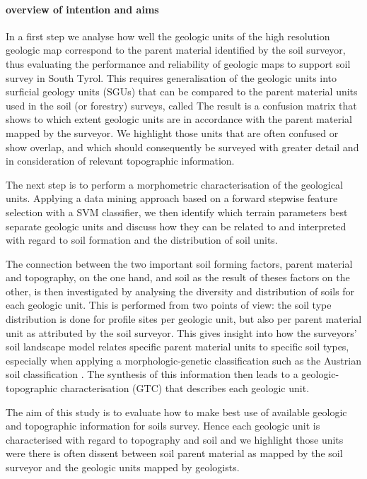 \documentclass[preprint,12pt,authoryear]{elsarticle}
\begin{document}
\paragraph{overview of intention and aims}
In a first step we analyse how well the geologic units of the high resolution geologic map correspond to the parent material identified by the soil surveyor, thus evaluating the performance and reliability of geologic maps to support soil survey in South Tyrol. This requires generalisation of the geologic units into surficial geology units (SGUs) that can be compared to the parent material units used in the soil (or forestry) surveys, called  The result is a confusion matrix that shows to which extent geologic units are in accordance with the parent material mapped by the surveyor.  We highlight those units that are often confused or show overlap, and which should consequently be surveyed with greater detail and in consideration of relevant topographic information.

The next step is to perform a morphometric characterisation of the geological units. Applying a data mining approach based on a forward stepwise feature selection with a SVM classifier, we then identify which terrain parameters best separate geologic units and discuss how they can be related to and interpreted with regard to soil formation and the distribution of soil units.

The connection between the two important soil forming factors, parent material and topography, on the one hand, and soil as the result of theses factors on the other, is then investigated by analysing the diversity and distribution of soils for each geologic unit. This is performed from two points of view: the soil type distribution is done for profile sites per geologic unit, but also per parent material unit as attributed by the soil surveyor. This gives insight into how the surveyors' soil landscape model relates specific parent material units to specific soil types, especially when applying a morphologic-genetic classification such as the Austrian soil classification \citep{Nestroy2011}. The synthesis of this information then leads to a geologic-topographic characterisation (GTC) that describes each geologic unit. 

The aim of this study is to evaluate how to make best use of available geologic and topographic information for soils survey. Hence each geologic unit is characterised with regard to topography and soil and we highlight those units were there is often dissent between soil parent material as mapped by the soil surveyor and the geologic units mapped by geologists.
\end{document}
